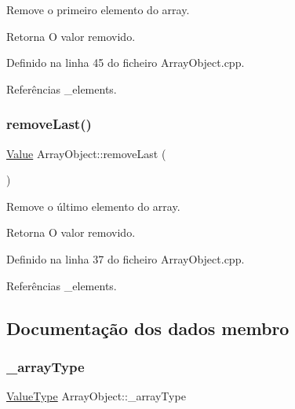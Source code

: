Remove o primeiro elemento do array. 

\begin{DoxyReturn}{Retorna}
O valor removido. 
\end{DoxyReturn}


Definido na linha 45 do ficheiro Array\+Object.\+cpp.



Referências \+\_\+elements.

\mbox{\label{classArrayObject_a5235153943129699da298a3ecc7cfa14}} 
\subsubsection{\texorpdfstring{remove\+Last()}{removeLast()}}
{\footnotesize\ttfamily \hyperlink{structValue}{Value} Array\+Object\+::remove\+Last (\begin{DoxyParamCaption}{ }\end{DoxyParamCaption})}



Remove o último elemento do array. 

\begin{DoxyReturn}{Retorna}
O valor removido. 
\end{DoxyReturn}


Definido na linha 37 do ficheiro Array\+Object.\+cpp.



Referências \+\_\+elements.



\subsection{Documentação dos dados membro}
\mbox{\label{classArrayObject_a83a4c777ec1059f3e85aaa698442f72b}} 
\subsubsection{\texorpdfstring{\+\_\+array\+Type}{\_arrayType}}
{\footnotesize\ttfamily \hyperlink{BasicTypes_8h_ad9971b6ef33e02ba2c75d19c1d2518a1}{Value\+Type} Array\+Object\+::\+\_\+array\+Type\hspace{0.3cm}{\ttfamily [private]}}

